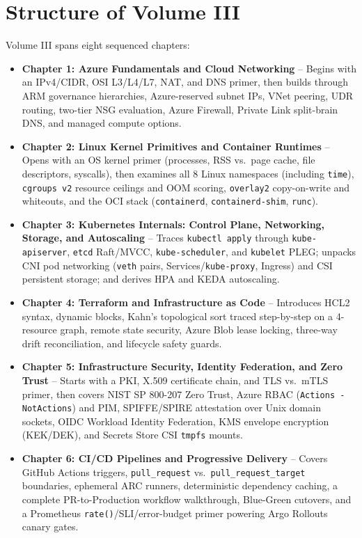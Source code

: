 \documentclass[11pt,oneside]{book}
\begin{document}
\section*{Structure of Volume III}
Volume III spans eight sequenced chapters:
\begin{itemize}[leftmargin=15pt]
  \item \textbf{Chapter 1: Azure Fundamentals and Cloud Networking} -- Begins with an IPv4/CIDR, OSI L3/L4/L7, NAT, and DNS primer, then builds through ARM governance hierarchies, Azure-reserved subnet IPs, VNet peering, UDR routing, two-tier NSG evaluation, Azure Firewall, Private Link split-brain DNS, and managed compute options.
  \item \textbf{Chapter 2: Linux Kernel Primitives and Container Runtimes} -- Opens with an OS kernel primer (processes, RSS vs.\ page cache, file descriptors, syscalls), then examines all 8 Linux namespaces (including \texttt{time}), \texttt{cgroups v2} resource ceilings and OOM scoring, \texttt{overlay2} copy-on-write and whiteouts, and the OCI stack (\texttt{containerd}, \texttt{containerd-shim}, \texttt{runc}).
  \item \textbf{Chapter 3: Kubernetes Internals: Control Plane, Networking, Storage, and Autoscaling} -- Traces \texttt{kubectl apply} through \texttt{kube-apiserver}, \texttt{etcd} Raft/MVCC, \texttt{kube-scheduler}, and \texttt{kubelet} PLEG; unpacks CNI pod networking (\texttt{veth} pairs, Services/\texttt{kube-proxy}, Ingress) and CSI persistent storage; and derives HPA and KEDA autoscaling.
  \item \textbf{Chapter 4: Terraform and Infrastructure as Code} -- Introduces HCL2 syntax, dynamic blocks, Kahn's topological sort traced step-by-step on a 4-resource graph, remote state security, Azure Blob lease locking, three-way drift reconciliation, and lifecycle safety guards.
  \item \textbf{Chapter 5: Infrastructure Security, Identity Federation, and Zero Trust} -- Starts with a PKI, X.509 certificate chain, and TLS vs.\ mTLS primer, then covers NIST SP 800-207 Zero Trust, Azure RBAC (\texttt{Actions - NotActions}) and PIM, SPIFFE/SPIRE attestation over Unix domain sockets, OIDC Workload Identity Federation, KMS envelope encryption (KEK/DEK), and Secrets Store CSI \texttt{tmpfs} mounts.
  \item \textbf{Chapter 6: CI/CD Pipelines and Progressive Delivery} -- Covers GitHub Actions triggers, \texttt{pull\_request} vs.\ \texttt{pull\_request\_target} boundaries, ephemeral ARC runners, deterministic dependency caching, a complete PR-to-Production workflow walkthrough, Blue-Green cutovers, and a Prometheus \texttt{rate()}/SLI/error-budget primer powering Argo Rollouts canary gates.

\end{itemize}
\end{document}
